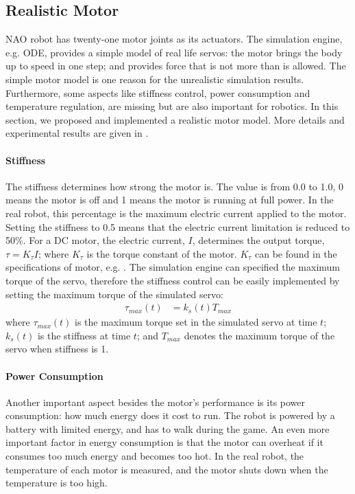 \documentclass{llncs}
\begin{document}
\subsection{Realistic Motor}
NAO robot has twenty-one motor joints as its actuators.
The simulation engine, e.g. ODE, provides a simple model of real life servos:
the motor brings the body up to speed in one step; and provides force that is not more than is allowed.
The simple motor model is one reason for the unrealistic simulation results.
Furthermore, some aspects like stiffness control, power consumption and temperature regulation, are missing but are also important for robotics.
In this section, we proposed and implemented a realistic motor model. More details and experimental results are given in \cite{Xu2012}.

\paragraph{Stiffness}
The stiffness determines how strong the motor is. The value is from 0.0
to 1.0, 0 means the motor is off and 1 means the motor is running at
full power. In the real robot,
this percentage is the maximum electric current applied to the motor. Setting the
stiffness to 0.5 means that the electric current limitation is reduced
to 50\%.
For a DC motor, the electric current, $I$, determines the output torque,
$\tau = K_\tau I \label{eq:tau-i}$;
where $K_\tau$ is the torque constant of the motor. $K_\tau$ can be found in the
specifications of motor, e.g. \cite{naoqi}.
The simulation engine can specified the maximum torque of the servo, therefore the
stiffness control can be easily implemented by setting the maximum torque
of the simulated servo:
\begin{align}
  \tau_{max}(t) &= k_{s}(t) T_{max}
\end{align}
where $\tau_{max}(t)$ is the maximum torque set in the simulated servo at
time $t$; $k_{s}(t)$ is the stiffness at time $t$; and $T_{max}$
denotes the maximum torque of the servo when stiffness is 1.

\paragraph{Power Consumption}
Another important aspect besides the motor's performance is its
power consumption: how much energy does it cost to run.
The robot is powered by a battery with limited energy, and has to walk during the
game.
An even more important factor in energy consumption is
that the motor can overheat if it consumes too much energy and
becomes too hot.
In the real robot, the temperature of each motor is measured, and the motor shuts down 
when the temperature is too high.
\end{document}
